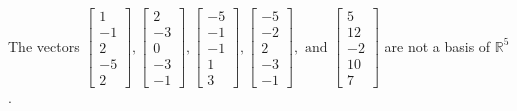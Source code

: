 \begin{exercise}
\begin{exerciseStatement}
  \end{exerciseStatement}
  \begin{exerciseAnswer}
   The vectors \(\left[\begin{array}{r}
1 \\
-1 \\
2 \\
-5 \\
2
\end{array}\right] , \left[\begin{array}{r}
2 \\
-3 \\
0 \\
-3 \\
-1
\end{array}\right] , \left[\begin{array}{r}
-5 \\
-1 \\
-1 \\
1 \\
3
\end{array}\right] , \left[\begin{array}{r}
-5 \\
-2 \\
2 \\
-3 \\
-1
\end{array}\right] , \text{ and } \left[\begin{array}{r}
5 \\
12 \\
-2 \\
10 \\
7
\end{array}\right]\) 
  	 are not  a basis of \(\mathbb{R}^5\).
  


  \end{exerciseAnswer}
\end{exercise}